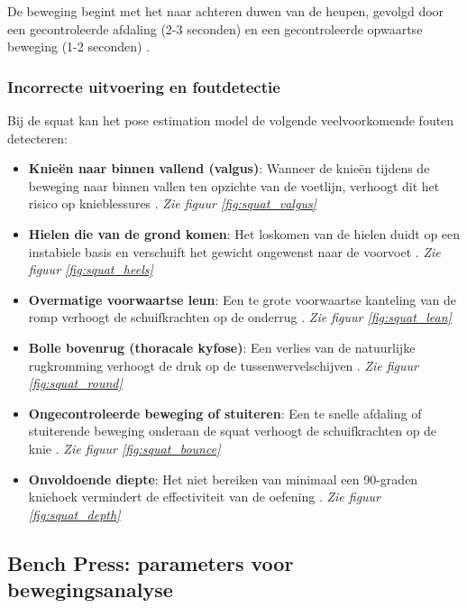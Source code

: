 De beweging begint met het naar achteren duwen van de heupen, gevolgd door een gecontroleerde afdaling (2-3 seconden) en een gecontroleerde opwaartse beweging (1-2 seconden) \autocite{Czaprowski2012}.

\subsubsection{Incorrecte uitvoering en foutdetectie}
Bij de squat kan het pose estimation model de volgende veelvoorkomende fouten detecteren:

\begin{itemize}
    \item \textbf{Knieën naar binnen vallend (valgus)}: Wanneer de knieën tijdens de beweging naar binnen vallen ten opzichte van de voetlijn, verhoogt dit het risico op knieblessures \autocite{Bengtsson2018}. \textit{Zie figuur \ref{fig:squat_valgus}}
    
    \item \textbf{Hielen die van de grond komen}: Het loskomen van de hielen duidt op een instabiele basis en verschuift het gewicht ongewenst naar de voorvoet \autocite{Czaprowski2012}. \textit{Zie figuur \ref{fig:squat_heels}}
    
    \item \textbf{Overmatige voorwaartse leun}: Een te grote voorwaartse kanteling van de romp verhoogt de schuifkrachten op de onderrug \autocite{Bengtsson2018}. \textit{Zie figuur \ref{fig:squat_lean}}
    
    \item \textbf{Bolle bovenrug (thoracale kyfose)}: Een verlies van de natuurlijke rugkromming verhoogt de druk op de tussenwervelschijven \autocite{Czaprowski2012}. \textit{Zie figuur \ref{fig:squat_round}}
    
    \item \textbf{Ongecontroleerde beweging of stuiteren}: Een te snelle afdaling of stuiterende beweging onderaan de squat verhoogt de schuifkrachten op de knie \autocite{Bengtsson2018}. \textit{Zie figuur \ref{fig:squat_bounce}}
    
    \item \textbf{Onvoldoende diepte}: Het niet bereiken van minimaal een 90-graden kniehoek vermindert de effectiviteit van de oefening \autocite{Comfort2018}. \textit{Zie figuur \ref{fig:squat_depth}}
\end{itemize}

\subsection{Bench Press: parameters voor bewegingsanalyse}


